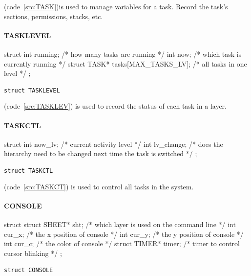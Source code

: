 \documentclass{swfcthesis}
\begin{document}
(code~\ref{src:TASK})is used to manage variables for a task. Record the task's sections,
permissions, stacks, etc.


\paragraph{TASKLEVEL}

\begin{listing}[H]
  \begin{codeblock}
\begin{ccode}
struct 
{ 
  int running;                      /* how many tasks are running */
  int now;                          /* which task is currently running */
  struct TASK* tasks[MAX_TASKS_LV]; /* all tasks in one level */
};
\end{ccode}
  \end{codeblock}
  \caption{\texttt{struct TASKLEVEL}}\label{src:TASKLEV}
\end{listing}

(code~\ref{src:TASKLEV}) is used to record the status of each task in a layer.


\paragraph{TASKCTL}

\begin{listing}[H]
  \begin{codeblock}
\begin{ccode}
struct 
{ 
  int now_lv;    /* current activity level */
  int lv_change; /* does the hierarchy need to be changed next time the task is switched */
};
\end{ccode}
  \end{codeblock}
  \caption{\texttt{struct TASKCTL}}\label{src:TASKCT}
\end{listing}

(code~\ref{src:TASKCT}) is used to control all tasks in the system.



\paragraph{CONSOLE}

\begin{listing}[H]
  \begin{codeblock}
\begin{ccode}
struct 
{ 
  struct SHEET* sht;   /* which layer is used on the command line */
  int cur_x;           /* the x position of console */
  int cur_y;           /* the y position of console */
  int cur_c;           /* the color of console */
  struct TIMER* timer; /* timer to control cursor blinking */
};
\end{ccode}
  \end{codeblock}
  \caption{\texttt{struct CONSOLE}}\label{src:CONSOLE}
\end{listing}
\end{document}
